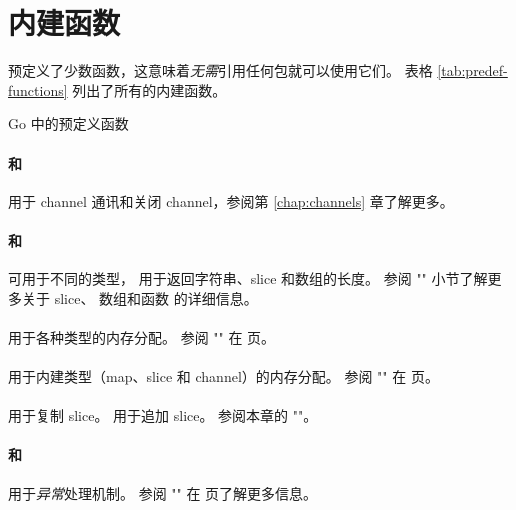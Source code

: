 \section{内建函数}
预定义了少数函数，这意味着\emph{无需}引用任何包就可以使用它们。
表格 \ref{tab:predef-functions} 列出了所有的内建函数。

\begin{table}[H]
\begin{center}
\caption{Go 中的预定义函数}
\label{tab:predef-functions}

\end{center}
\end{table}

\paragraph{ 和 } 用于 channel
通讯和关闭 channel，参阅第 \ref{chap:channels} 章了解更多。

\paragraph{ 和 } 可用于不同的类型，
 用于返回字符串、slice 和数组的长度。
参阅 "" 小节了解更多关于 slice、
数组和函数  的详细信息。

\paragraph{} 用于各种类型的内存分配。
参阅 "" 在 \pageref{sec:allocation with new} 页。

\paragraph{} 用于内建类型（map、slice 和 channel）的内存分配。
参阅 "" 在 \pageref{sec:allocation with make} 页。

\paragraph{} 用于复制 slice。 用于追加 slice。
参阅本章的 ""。

\paragraph{ 和 } 用于\emph{异常}处理机制。
参阅 "" 在 \pageref{sec:panic} 页了解更多信息。

